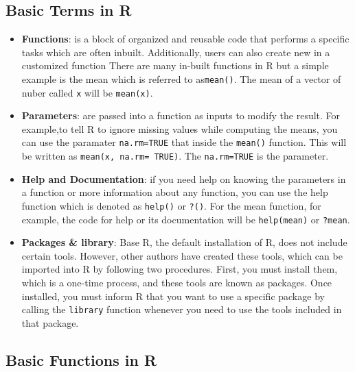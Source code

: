 \documentclass[
]{article}
\begin{document}
\hypertarget{basic-terms-in-r}{%
\subsection{Basic Terms in R}\label{basic-terms-in-r}}

\begin{itemize}
\item
  \textbf{Functions}: is a block of organized and reusable code that
  performs a specific tasks which are often inbuilt. Additionally, users
  can also create new in a customized function There are many in-built
  functions in R but a simple example is the mean which is referred to
  as\texttt{mean()}. The mean of a vector of nuber called \texttt{x}
  will be \texttt{mean(x)}.
\item
  \textbf{Parameters}: are passed into a function as inputs to modify
  the result. For example,to tell R to ignore missing values while
  computing the means, you can use the paramater \texttt{na.rm=TRUE}
  that inside the \texttt{mean()} function. This will be written as
  \texttt{mean(x,\ na.rm=\ TRUE)}. The \texttt{na.rm=TRUE} is the
  parameter.
\item
  \textbf{Help and Documentation}: if you need help on knowing the
  parameters in a function or more information about any function, you
  can use the help function which is denoted as \texttt{help()} or
  \texttt{?()}. For the mean function, for example, the code for help or
  its documentation will be \texttt{help(mean)} or \texttt{?mean}.
\item
  \textbf{Packages \& library}: Base R, the default installation of R,
  does not include certain tools. However, other authors have created
  these tools, which can be imported into R by following two procedures.
  First, you must install them, which is a one-time process, and these
  tools are known as packages. Once installed, you must inform R that
  you want to use a specific package by calling the \texttt{library}
  function whenever you need to use the tools included in that package.
\end{itemize}

\hypertarget{basic-functions-in-r}{%
\subsection{Basic Functions in R}\label{basic-functions-in-r}}
\end{document}
